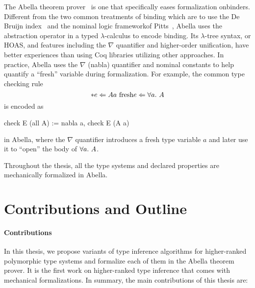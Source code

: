 The Abella theorem prover~\citep{AbellaDesc}
is one that specifically eases formalization onbinders.
Different from the two common treatments of binding
which are to use the De Bruijn index~\citep{DEBRUIJN1972381}
and the nominal logic frameworkof Pitts~\citep{PITTS2003165},
Abella uses the abstraction operator in a typed $\lambda$-calculus to encode binding.
Its $\lambda$-tree syntax, or HOAS, and features including the $\nabla$ quantifier
and higher-order unification, have better experiences than using Coq libraries
utilizing other approaches.
In practice, Abella uses the $\nabla$ (nabla) quantifier and nominal constants to help
quantify a ``fresh'' variable during formalization.
For example, the common type checking rule
$$\inferrule*{e \Lto A \\ a \text{ fresh}}{e \Lto \all A}$$
is encoded as
\begin{abella}
  check E (all A) := nabla a, check E (A a)
\end{abella}
in Abella, where the $\nabla$ quantifier introduces a fresh type variable $a$
and later use it to ``open'' the body of $\all A$.

Throughout the thesis, all the type systems and declared properties are
mechanically formalized in Abella.



\section{Contributions and Outline}

\paragraph{Contributions}

In this thesis, we propose variants of type inference algorithms
for higher-ranked polymorphic type systems
and formalize each of them in the Abella theorem prover.
It is the first work on higher-ranked type inference
that comes with mechanical formalizations.
In summary, the main contributions of this thesis are:


